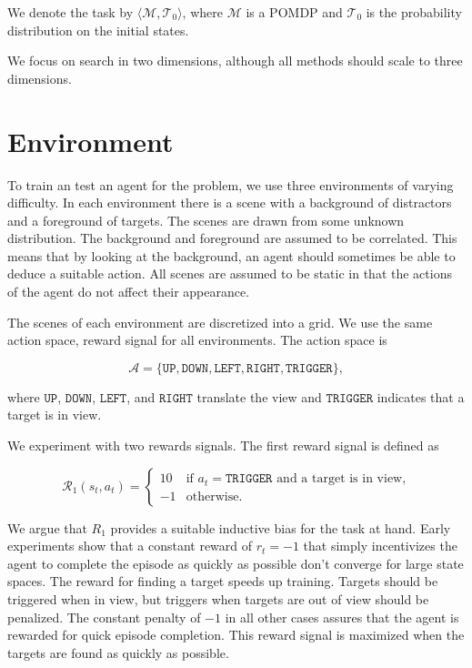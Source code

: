 We denote the task by \(\langle \mathcal{M}, \mathcal{T}_0 \rangle\), where \(\mathcal{M}\) is a POMDP and \(\mathcal{T}_0\) is the probability distribution on the initial states.

We focus on search in two dimensions, although all methods should scale to three dimensions.

\section{Environment}
\label{sec:environment}

To train an test an agent for the problem, we use three environments of varying difficulty.
In each environment there is a scene with a background of distractors and a foreground of targets.
The scenes are drawn from some unknown distribution.
The background and foreground are assumed to be correlated.
This means that by looking at the background, an agent should sometimes be able to deduce a suitable action.
All scenes are assumed to be static in that the actions of the agent do not affect their appearance.

The scenes of each environment are discretized into a grid.
We use the same action space, reward signal for all environments.
The action space is

\[
    \mathcal{A} = \lbrace \mathtt{UP}, \mathtt{DOWN}, \mathtt{LEFT}, \mathtt{RIGHT}, \mathtt{TRIGGER} \rbrace,
\]

where \(\mathtt{UP}\), \(\mathtt{DOWN}\), \(\mathtt{LEFT}\), and \(\mathtt{RIGHT}\) translate the view and \(\mathtt{TRIGGER}\) indicates that a target is in view.


We experiment with two rewards signals. The first reward signal is defined as

\[
    \mathcal{R}_1(s_t, a_t) =
    \begin{cases}
        10 & \text{if \(a_t = \mathtt{TRIGGER}\) and a target is in view,} \\
        -1 & \text{otherwise.}
    \end{cases}
\]

We argue that \(R_1\) provides a suitable inductive bias for the task at hand.
Early experiments show that a constant reward of \(r_t = -1\) that simply incentivizes the agent to complete the episode as quickly as possible don't converge for large state spaces.
The reward for finding a target speeds up training.
Targets should be triggered when in view, but triggers when targets are out of view should be penalized.
The constant penalty of \(-1\) in all other cases assures that the agent is rewarded for quick episode completion.
This reward signal is maximized when the targets are found as quickly as possible.

